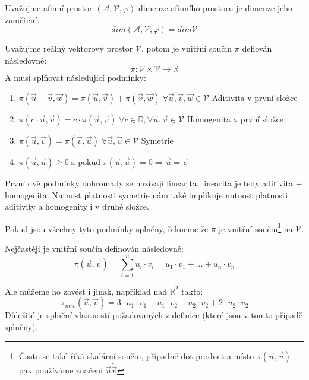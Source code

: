 \begin{definition}
    Uvažujme afinní prostor $(\mathcal{A}, \mathcal{V}, \varphi)$ dimenze afinního
    prostoru je dimenze jeho zaměření.
    $$dim (\mathcal{A}, \mathcal{V}, \varphi) = dim \mathcal{V}$$
\end{definition}

\begin{definition}
    Uvažujme reálný vektorový prostor $\mathcal{V}$, potom je vnitřní součin $\pi$ defiován následovně:
    $$\pi: \mathcal{V} \times \mathcal{V} \rightarrow \mathbb{R}$$
    A musí splňovat následujicí podmínky:
    \begin{enumerate}
        \item $\pi(\vec{u} + \vec{v}, \vec{w}) = \pi(\vec{u}, \vec{v}) + \pi(\vec{v}, \vec{w})\;
        \forall \vec{u}, \vec{v}, \vec{w} \in \mathcal{V}$ \hfill Aditivita v první složce

        \item $\pi(c \cdot \vec{u}, \vec{v}) = c \cdot \pi(\vec{u}, \vec{v})\; \forall c\in \mathbb{R},
        \forall \vec{u}, \vec{v} \in \mathcal{V}$ \hfill Homogenita v první složce

        \item $\pi(\vec{u}, \vec{v}) = \pi(\vec{v}, \vec{u})\;
        \forall \vec{u}, \vec{v} \in \mathcal{V}$ \hfill Symetrie

        \item $\pi(\vec{u}, \vec{u}) \geq 0\;\text{a pokud}\; \pi(\vec{u}, \vec{u}) = 0 \Rightarrow \vec{u} = \vec{o}$
    \end{enumerate}
    První dvě podmínky dohromady se nazívají linearita, linearita je tedy aditivita + homogenita. Nutnost platnosti
    symetrie nám také implikuje nutnost platnosti aditivity a homogenity i v druhé složce.

    Pokud jsou všechny tyto podmínky splněny, řekneme že $\pi$ je vnitřní součin\footnote{Často se také říká
    skalární součin, případně dot product a místo $\pi(\vec{u}, \vec{v})$ pak používáme
    značení $\vec{u} \dot \vec{v}$} na $\mathcal{V}$.
\end{definition}

Nejčastěji je vnitřní součin definován následovně:
$$\pi(\vec{u}, \vec{v}) = \sum_{i=1}^n u_i \cdot v_i = u_1 \cdot v_1 + \ldots + u_n \cdot v_n$$

Ale můžeme ho zavést i jinak, například nad $\mathbb{R}^2$ takto:
$$\pi_{new}(\vec{u}, \vec{v}) = 3\cdot u_1 \cdot v_1 - u_1 \cdot v_2 - u_2 \cdot v_2 + 2 \cdot u_2 \cdot v_2$$
Důležité je splnění vlastností požadovaných z definice (které jsou v tomto případě splněny).

